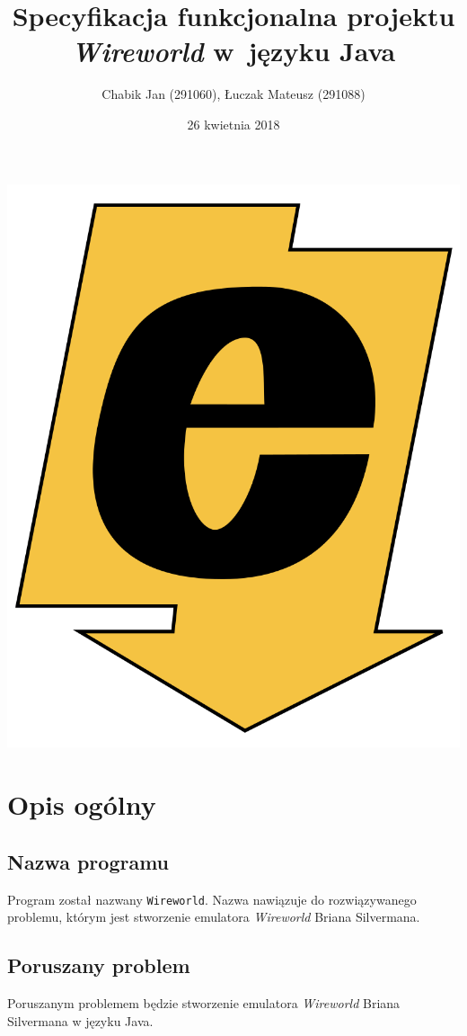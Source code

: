 \documentclass[a4paper,12pt]{article}
\title{Specyfikacja funkcjonalna projektu \textit{Wireworld} w~języku Java}
\author{Chabik Jan (291060), Łuczak Mateusz (291088)}
\date{26 kwietnia 2018}
\begin{document}
\maketitle
\thispagestyle{empty}
\begin{center}
	\includegraphics[scale=0.1]{logo_ee_big.png}
\end{center}
\newpage

\tableofcontents
{}
\newpage

\section{Opis ogólny}
\subsection{Nazwa programu}
Program został nazwany \texttt{Wireworld}. Nazwa nawiązuje do rozwiązywanego problemu, którym jest stworzenie emulatora \textit{Wireworld} Briana Silvermana.

\subsection{Poruszany problem}
Poruszanym problemem będzie stworzenie emulatora \textit{Wireworld} Briana Silvermana w języku Java.
\end{document}
